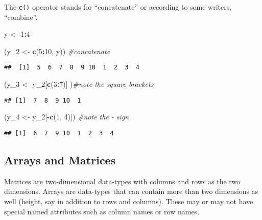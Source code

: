\documentclass[11pt,]{article}
\newenvironment{Shaded}{\begin{snugshade}}{\end{snugshade}}
\newcommand{\KeywordTok}[1]{\textcolor[rgb]{0.13,0.29,0.53}{\textbf{#1}}}
\newcommand{\DecValTok}[1]{\textcolor[rgb]{0.00,0.00,0.81}{#1}}
\newcommand{\StringTok}[1]{\textcolor[rgb]{0.31,0.60,0.02}{#1}}
\newcommand{\CommentTok}[1]{\textcolor[rgb]{0.56,0.35,0.01}{\textit{#1}}}
\newcommand{\OperatorTok}[1]{\textcolor[rgb]{0.81,0.36,0.00}{\textbf{#1}}}
\newcommand{\NormalTok}[1]{#1}
\begin{document}
The \texttt{c()} operator stands for ``concatenate'' or according to
some writers, ``combine''.

\begin{Shaded}
\begin{Highlighting}[]
\NormalTok{y <-}\StringTok{ }\DecValTok{1}\OperatorTok{:}\DecValTok{4}

\NormalTok{(y_}\DecValTok{2}\NormalTok{ <-}\StringTok{ }\KeywordTok{c}\NormalTok{(}\DecValTok{5}\OperatorTok{:}\DecValTok{10}\NormalTok{, y)) }\CommentTok{#concatenate}
\end{Highlighting}
\end{Shaded}

\begin{verbatim}
##  [1]  5  6  7  8  9 10  1  2  3  4
\end{verbatim}

\begin{Shaded}
\begin{Highlighting}[]
\NormalTok{(y_}\DecValTok{3}\NormalTok{ <-}\StringTok{ }\NormalTok{y_}\DecValTok{2}\NormalTok{[}\KeywordTok{c}\NormalTok{(}\DecValTok{3}\OperatorTok{:}\DecValTok{7}\NormalTok{)] )}\CommentTok{#note the square brackets}
\end{Highlighting}
\end{Shaded}

\begin{verbatim}
## [1]  7  8  9 10  1
\end{verbatim}

\begin{Shaded}
\begin{Highlighting}[]
\NormalTok{(y_}\DecValTok{4}\NormalTok{ <-}\StringTok{ }\NormalTok{y_}\DecValTok{2}\NormalTok{[}\OperatorTok{-}\KeywordTok{c}\NormalTok{(}\DecValTok{1}\NormalTok{, }\DecValTok{4}\NormalTok{)]) }\CommentTok{#note the - sign}
\end{Highlighting}
\end{Shaded}

\begin{verbatim}
## [1]  6  7  9 10  1  2  3  4
\end{verbatim}

\subsection{Arrays and Matrices}\label{arrays-and-matrices}

Matrices are two-dimensional data-types with columns and rows as the two
dimensions. Arrays are data-types that can contain more than two
dimensions as well (height, say in addition to rows and columns). These
may or may not have special named attributes such as column names or row
names.
\end{document}
